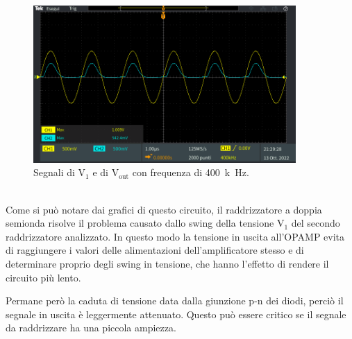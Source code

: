 \documentclass{report}
\begin{document}
\begin{figure}[h!]
	\centering
	\includegraphics[height=6cm]{immagini/TEK00030}
	\caption{Segnali di $\mathrm{V_1}$ e di $\mathrm{V_{out}}$ con frequenza di \SI{400}{k\hertz}.}
	\label{figura:TEK00030}
\end{figure} 
\\Come si può notare dai grafici di questo circuito, il raddrizzatore a doppia semionda risolve il problema causato dallo swing della tensione $\displaystyle\mathrm{V_1}$ del secondo raddrizzatore analizzato. In questo modo la tensione in uscita all'OPAMP evita di raggiungere i valori delle alimentazioni dell'amplificatore stesso e di determinare proprio degli swing in tensione, che hanno l'effetto di rendere il circuito più lento.\par 
Permane però la caduta di tensione data dalla giunzione p-n dei diodi, perciò il segnale in uscita è leggermente attenuato. Questo può essere critico se il segnale da raddrizzare ha una piccola ampiezza.

\end{document}
